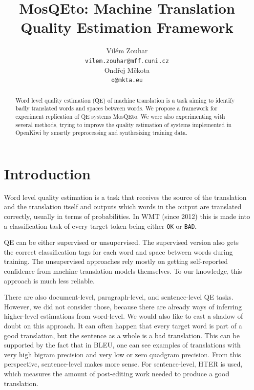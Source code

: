 \documentclass[12pt]{article}
\title{MosQEto: Machine Translation Quality Estimation Framework}
\author{
 Vilém Zouhar \\ \texttt{vilem.zouhar@mff.cuni.cz} \\
 \And
 Ondřej Měkota \\ \texttt{o@mkta.eu} \\
}
\begin{document}
\setlength{\headheight}{16pt}
\maketitle

\begin{abstract}
Word level quality estimation (QE) of machine translation is a task aiming to identify badly translated words and spaces between words. We propose a framework for experiment replication of QE systems MosQEto. We were also experimenting with several methods, trying to improve the quality estimation of systems implemented in OpenKiwi by smartly preprocessing and synthesizing training data. 
\end{abstract}


\section{Introduction}
Word level quality estimation is a task that receives the source of the translation and the translation itself and outputs which words in the output are translated correctly, usually in terms of probabilities. In WMT (since 2012) this is made into a classification task of every target token being either \texttt{OK} or \texttt{BAD}.

QE can be either supervised or unsupervised. The supervised version also gets the correct classification tags for each word and space between words during training. The unsupervised approaches rely mostly on getting self-reported confidence from machine translation models themselves. To our knowledge, this approach is much less reliable.

There are also document-level, paragraph-level, and sentence-level QE tasks. However, we did not consider those, because there are already ways of inferring higher-level estimations from word-level. We would also like to cast a shadow of doubt on this approach. It can often happen that every target word is part of a good translation, but the sentence as a whole is a bad translation. This can be supported by the fact that in BLEU, one can see examples of translations with very high bigram precision and very low or zero quadgram precision. From this perspective, sentence-level makes more sense. For sentence-level, HTER is used, which measures the amount of post-editing work needed to produce a good translation.
\end{document}
